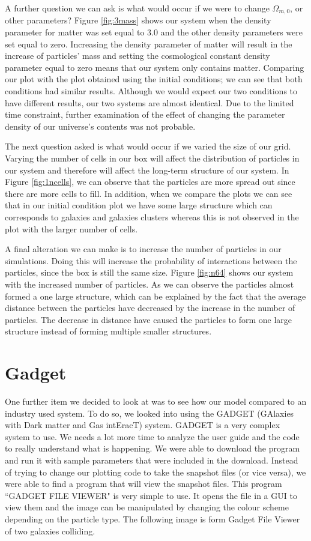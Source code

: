 \documentclass[10pt]{article}
\begin{document}
	A further question we can ask is what would occur if we were to change $\Omega_{m,0}$, or other parameters? Figure \ref{fig:3mass} shows our system when the density parameter for matter was set equal to 3.0 and the other density parameters were set equal to zero. Increasing the density parameter of matter will result in the increase of particles’ mass and setting the cosmological constant density parameter equal to zero means that our system only contains matter. Comparing our plot with the plot obtained using the initial conditions; we can see that both conditions had similar results. Although we would expect our two conditions to have different results, our two systems are almost identical. Due to the limited time constraint, further examination of the effect of changing the parameter density of our universe’s contents was not probable.   

	The next question asked is what would occur if we varied the size of our grid. Varying the number of cells in our box will affect the distribution of particles in our system and therefore will affect the long-term structure of our system. In Figure \ref{fig:1ncells}, we can observe that the particles are more spread out since there are more cells to fill. In addition, when we compare the plots we can see that in our initial condition plot we have some large structure which can corresponds to galaxies and galaxies clusters whereas this is not observed in the plot with the larger number of cells. 
	
	A final alteration we can make is to increase the number of particles in our simulations. Doing this will increase the probability of interactions between the particles, since the box is still the same size. Figure \ref{fig:n64} shows our system with the increased number of particles. As we can observe the particles almost formed a one large structure, which can be explained by the fact that the average distance between the particles have decreased by the increase in the number of particles. The decrease in distance have caused the particles to form one large structure instead of forming multiple smaller structures.   



\section{Gadget}
	One further item we decided to look at was to see how our model compared to an industry used system. To do so, we looked into using the GADGET (GAlaxies with Dark matter and Gas intEracT) system.
	GADGET is a very complex system to use. We needs a lot more time to analyze the user guide and the code to really understand what is happening. We were able to download the program and run it with sample parameters that were included in the download. Instead of trying to change our plotting code to take the snapshot files (or vice versa), we were able to find a program that will view the snapshot files. This program ``GADGET FILE VIEWER" is very simple to use. It opens the file in a GUI to view them and the image can be manipulated by changing the colour scheme depending on the particle type. The following image is form Gadget File Viewer of two galaxies colliding.
\end{document}
